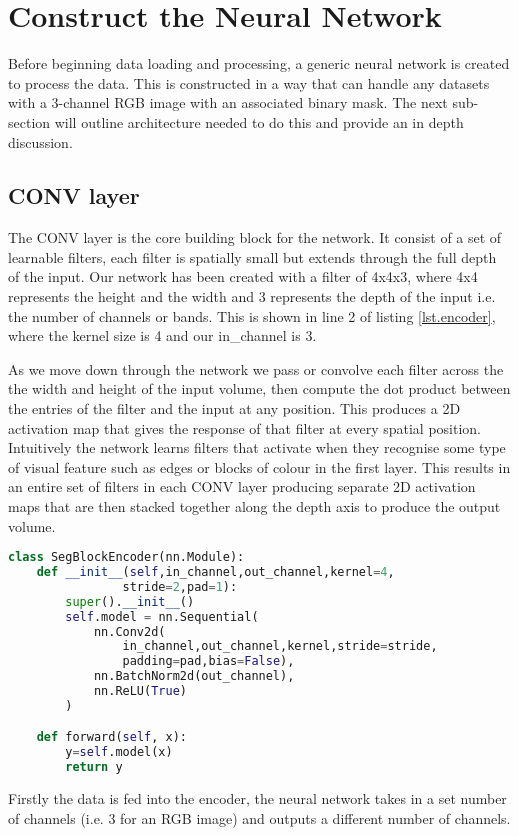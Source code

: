 \section{Construct the Neural Network}
Before beginning data loading and processing, a generic neural network is created to process the data. This is constructed in a way that can handle any datasets with a 3-channel RGB image with an associated binary mask. The next sub-section will outline architecture needed to do this and provide an in depth discussion.
\subsection{\textbf{CONV} layer}
The CONV layer is the core building block for the network. It consist of a set of learnable filters, each filter is spatially small but extends through the full depth of the input. Our network has been created with a filter of 4x4x3, where 4x4 represents the height and the width and 3 represents the depth of the input i.e. the number of channels or bands. This is shown in line 2 of listing \ref{lst.encoder}, where the kernel size is 4 and our in\_channel is 3. \par
As we move down through the network we pass or convolve each filter across the the width and height of the input volume, then compute the dot product between the entries of the filter and the input at any position. This produces a 2D activation map that gives the response of that filter at every spatial position. Intuitively the network learns filters that activate when they recognise some type of visual feature such as edges or blocks of colour in the first layer. This results in an entire set of filters in each CONV layer producing separate 2D activation maps that are then stacked together along the depth axis to produce the output volume.
\begin{lstlisting}[language=Python, caption = Encoder architecture, label={lst.encoder}]
class SegBlockEncoder(nn.Module):
    def __init__(self,in_channel,out_channel,kernel=4,
                stride=2,pad=1):
        super().__init__()
        self.model = nn.Sequential(
            nn.Conv2d(
                in_channel,out_channel,kernel,stride=stride,
                padding=pad,bias=False),
            nn.BatchNorm2d(out_channel),
            nn.ReLU(True)
        )

    def forward(self, x):
        y=self.model(x)
        return y
\end{lstlisting}
Firstly the data is fed into the encoder, the neural network takes in a set number of channels (i.e. 3 for an RGB image) and outputs a different number of channels.

